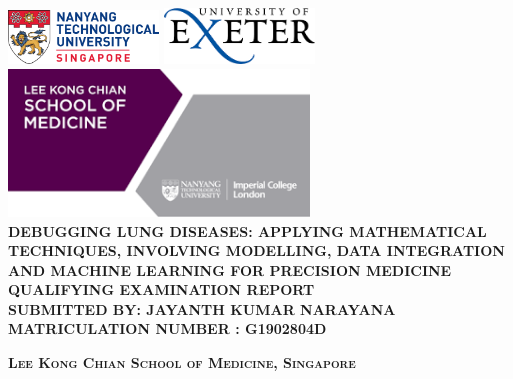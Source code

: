 \begin{titlepage}
\begin{center}

\includegraphics[width=0.3\textwidth]{image/ntu_logo.png} \hfill \includegraphics[width=0.3\textwidth]{image/uoe_logo.png}
\\[2cm]
\includegraphics[width=0.6\textwidth]{image/lkc_logo.png}
\\[4cm]

\uppercase{\textbf{\Large{
Debugging Lung Diseases: Applying mathematical techniques, involving modelling, data integration and machine learning for precision medicine \\[2cm]
Qualifying Examination Report}}}
\\[2cm]

\uppercase{
\textbf{
Submitted by: Jayanth Kumar Narayana
}
\\
\textbf{
Matriculation Number : G1902804D\\
}}

\vfill

\textsc{\bfseries Lee Kong Chian School of Medicine, Singapore}


\end{center}
\end{titlepage}